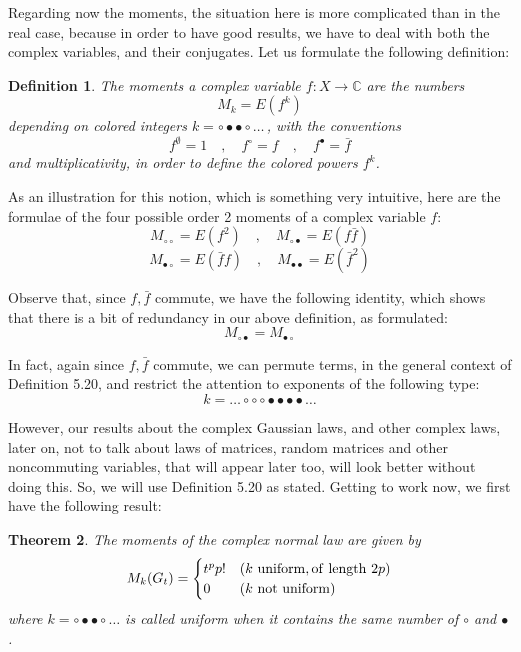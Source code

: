 \documentclass[12pt]{amsbook}
\newtheorem{theorem}{Theorem}[chapter]
\newtheorem{definition}[theorem]{Definition}
\begin{document}
Regarding now the moments, the situation here is more complicated than in the real case, because in order to have good results, we have to deal with both the complex variables, and their conjugates. Let us formulate the following definition:


\begin{definition}
The moments a complex variable $f:X\to\mathbb C$ are the numbers
$$M_k=E(f^k)$$
depending on colored integers $k=\circ\bullet\bullet\circ\ldots\,$, with the conventions
$$f^\emptyset=1\quad,\quad f^\circ=f\quad,\quad f^\bullet=\bar{f}$$
and multiplicativity, in order to define the colored powers $f^k$.
\end{definition}

As an illustration for this notion, which is something very intuitive, here are the formulae of the four possible order 2 moments of a complex variable $f$:
$$M_{\circ\circ}=E(f^2)\quad,\quad M_{\circ\bullet}=E(f\bar{f})$$
$$M_{\bullet\circ}=E(\bar{f}f)\quad,\quad M_{\bullet\bullet}=E(\bar{f}^2)$$

Observe that, since $f,\bar{f}$ commute, we have the following identity, which shows that there is a bit of redundancy in our above definition, as formulated:
$$M_{\circ\bullet}=M_{\bullet\circ}$$

In fact, again since $f,\bar{f}$ commute, we can permute terms, in the general context of Definition 5.20, and restrict the attention to exponents of the following type:
$$k=\ldots\circ\circ\circ\bullet\bullet\bullet\bullet\ldots$$

However, our results about the complex Gaussian laws, and other complex laws, later on, not to talk about laws of matrices, random matrices and other noncommuting variables, that will appear later too, will look better without doing this. So, we will use Definition 5.20 as stated. Getting to work now, we first have the following result:


\begin{theorem}
The moments of the complex normal law are given by
$$M_k(G_t)=\begin{cases}
t^pp!&(k\ {\rm uniform, of\ length}\ 2p)\\
0&(k\ {\rm not\ uniform})
\end{cases}$$
where $k=\circ\bullet\bullet\circ\ldots$ is called uniform when it contains the same number of $\circ$ and $\bullet$.
\end{theorem}
\end{document}
